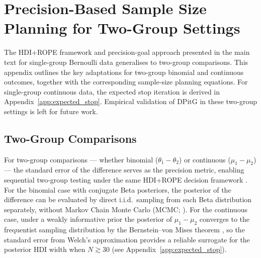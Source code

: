 \section{Precision-Based Sample Size Planning for Two-Group Settings}\label{app:extensions}

The HDI+ROPE framework and precision-goal approach presented in the main text for single-group
Bernoulli data generalises to two-group comparisons.
This appendix outlines the key adaptations for two-group binomial and continuous
outcomes, together with the corresponding sample-size planning equations.
For single-group continuous data, the expected stop iteration is derived in
Appendix~\ref{app:expected_stop}.
Empirical validation of DPitG in these two-group settings is left for future work.

\subsection*{Two-Group Comparisons}

For two-group comparisons --- whether binomial ($\theta_1 - \theta_2$) or continuous
($\mu_1 - \mu_2$) --- the standard error of the difference serves as the precision
metric, enabling sequential two-group testing under the same HDI+ROPE decision framework
\citep{kruschke2013}.
For the binomial case with conjugate Beta posteriors, the posterior of the difference
can be evaluated by direct i.i.d.\ sampling from each Beta distribution separately,
without Markov Chain Monte Carlo (MCMC; \citealt{gelman2013bayesian}).
For the continuous case, under a weakly informative prior the posterior of
$\mu_1 - \mu_2$ converges to the frequentist sampling distribution by the
Bernstein--von Mises theorem \citep{gelman2013bayesian}, so the standard error from
Welch's approximation provides a reliable surrogate for the posterior HDI width when
$N \gtrsim 30$ (see Appendix~\ref{app:expected_stop}).

